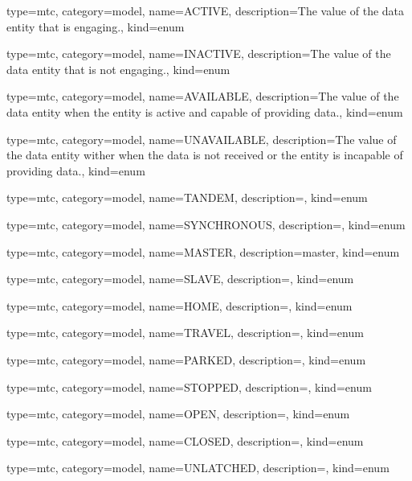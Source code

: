 {
  type=mtc,
  category=model,
  name={ACTIVE},
  description={The value of the \gls{data entity} that is engaging.},
  kind={enum}
}


{
  type=mtc,
  category=model,
  name={INACTIVE},
  description={The value of the \gls{data entity} that is not engaging.},
  kind={enum}
}


{
  type=mtc,
  category=model,
  name={AVAILABLE},
  description={The value of the \gls{data entity} when the entity is active and capable of providing data.},
  kind={enum}
}


{
  type=mtc,
  category=model,
  name={UNAVAILABLE},
  description={The value of the \gls{data entity} wither when the data is not received or the entity is incapable of providing data.},
  kind={enum}
}


{
  type=mtc,
  category=model,
  name={TANDEM},
  description={},
  kind={enum}
}


{
  type=mtc,
  category=model,
  name={SYNCHRONOUS},
  description={},
  kind={enum}
}


{
  type=mtc,
  category=model,
  name={MASTER},
  description={master},
  kind={enum}
}


{
  type=mtc,
  category=model,
  name={SLAVE},
  description={},
  kind={enum}
}


{
  type=mtc,
  category=model,
  name={HOME},
  description={},
  kind={enum}
}


{
  type=mtc,
  category=model,
  name={TRAVEL},
  description={},
  kind={enum}
}


{
  type=mtc,
  category=model,
  name={PARKED},
  description={},
  kind={enum}
}


{
  type=mtc,
  category=model,
  name={STOPPED},
  description={},
  kind={enum}
}


{
  type=mtc,
  category=model,
  name={OPEN},
  description={},
  kind={enum}
}


{
  type=mtc,
  category=model,
  name={CLOSED},
  description={},
  kind={enum}
}


{
  type=mtc,
  category=model,
  name={UNLATCHED},
  description={},
  kind={enum}
}


